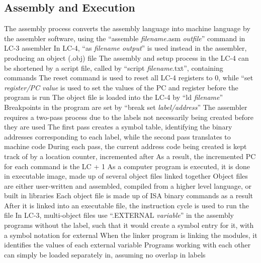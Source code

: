 \documentclass[11 pt, twoside]{article}
\newenvironment{outline*}
{
	\begin{outline}[enumerate]
	}
	{\end{outline}
}
\begin{document}
\subsection{Assembly and Execution}
\begin{outline*}
\1 The assembly process converts the assembly language into machine language by the assembler software, using the ``assemble \textit{filename}.asm \textit{outfile}'' command in LC-3 assembler
\2 In LC-4, ``as \textit{filename output}'' is used instead in the assembler, producing an object (.obj) file
\2 The assembly and setup process in the LC-4 can be shortened by a script file, called by ``script \textit{filename}.txt'', containing commands
\3 The reset command is used to reset all LC-4 registers to 0, while ``set \textit{register/PC value} is used to set the values of the PC and register before the program is run
\3 The object file is loaded into the LC-4 by ``ld \textit{filename}''
\3 Breakpoints in the program are set by ``break set \textit{label/address}''
\1 The assembler requires a two-pass process due to the labels not necessarily being created before they are used
\2 The first pass creates a symbol table, identifying the binary addresses corresponding to each label, while the second pass translates to machine code
\2 During each pass, the current address code being created is kept track of by a location counter, incremented after
\3 As a result, the incremented PC for each command is the LC + 1
\1 As a computer program is executed, it is done in executable image, made up of several object files linked together
\2 Object files are either user-written and assembled, compiled from a higher level language, or built in libraries
\2 Each object file is made up of ISA binary commands as a result
\2 After it is linked into an executable file, the instruction cycle is used to run the file
\1 In LC-3, multi-object files use ``.EXTERNAL \textit{variable}'' in the assembly programs without the label, such that it would create a symbol entry for it, with a symbol notation for external
\2 When the linker program is linking the modules, it identifies the values of each external variable
\2 Programs working with each other can simply be loaded separately in, assuming no overlap in labels
\end{outline*}
\end{document}
